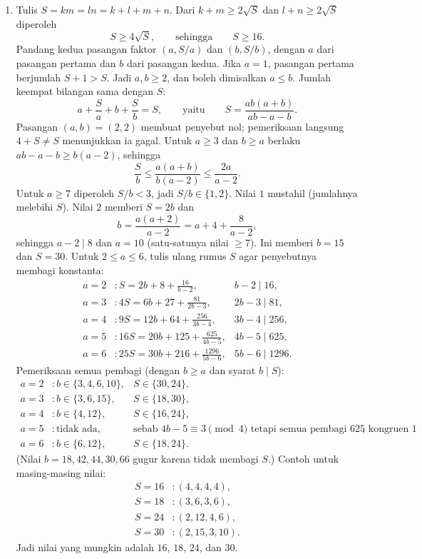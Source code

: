 \documentclass[12pt]{scrartcl}
\begin{document}
\begin{enumerate}[resume]
	\item Tulis $S = km = ln = k + l + m + n$.
	Dari $k + m \ge 2\sqrt{S}$ dan $l + n \ge 2\sqrt{S}$ diperoleh
	\[ S \ge 4\sqrt{S}, \qquad \text{sehingga} \qquad S \ge 16. \]
	Pandang kedua pasangan faktor $(a, S/a)$ dan $(b, S/b)$,
	dengan $a$ dari pasangan pertama dan $b$ dari pasangan kedua.
	Jika $a = 1$, pasangan pertama berjumlah $S + 1 > S$.
	Jadi $a, b \ge 2$, dan boleh dimisalkan $a \le b$.
	Jumlah keempat bilangan sama dengan $S$:
	\[ a + \frac{S}{a} + b + \frac{S}{b} = S, \qquad
	\text{yaitu} \qquad S = \frac{ab(a + b)}{ab - a - b}. \]
	Pasangan $(a, b) = (2, 2)$ membuat penyebut nol;
	pemeriksaan langsung $4 + S \ne S$ menunjukkan ia gagal.
	Untuk $a \ge 3$ dan $b \ge a$ berlaku $ab - a - b \ge b(a - 2)$, sehingga
	\[ \frac{S}{b} \le \frac{a(a + b)}{b(a - 2)} \le \frac{2a}{a - 2}. \]
	Untuk $a \ge 7$ diperoleh $S/b < 3$, jadi $S/b \in \{1, 2\}$.
	Nilai $1$ mustahil (jumlahnya melebihi $S$).
	Nilai $2$ memberi $S = 2b$ dan
	\[ b = \frac{a(a + 2)}{a - 2} = a + 4 + \frac{8}{a - 2}, \]
	sehingga $a - 2 \mid 8$ dan $a = 10$ (satu-satunya nilai $\ge 7$).
	Ini memberi $b = 15$ dan $S = 30$.
	Untuk $2 \le a \le 6$, tulis ulang rumus $S$ agar penyebutnya membagi konstanta:
	\begin{align*}
	a = 2 &: S = 2b + 8 + \frac{16}{b - 2}, &
	b - 2 \mid 16, \\
	a = 3 &: 4S = 6b + 27 + \frac{81}{2b - 3}, &
	2b - 3 \mid 81, \\
	a = 4 &: 9S = 12b + 64 + \frac{256}{3b - 4}, &
	3b - 4 \mid 256, \\
	a = 5 &: 16S = 20b + 125 + \frac{625}{4b - 5}, &
	4b - 5 \mid 625, \\
	a = 6 &: 25S = 30b + 216 + \frac{1296}{5b - 6}, &
	5b - 6 \mid 1296.
	\end{align*}
	Pemeriksaan semua pembagi (dengan $b \ge a$ dan syarat $b \mid S$):
	\begin{align*}
	a = 2 &: b \in \{3, 4, 6, 10\}, & S \in \{30, 24\}, \\
	a = 3 &: b \in \{3, 6, 15\}, & S \in \{18, 30\}, \\
	a = 4 &: b \in \{4, 12\}, & S \in \{16, 24\}, \\
	a = 5 &: \text{tidak ada}, &
	\text{sebab $4b - 5 \equiv 3 \pmod{4}$ tetapi semua pembagi $625$ kongruen $1$}, \\
	a = 6 &: b \in \{6, 12\}, & S \in \{18, 24\}.
	\end{align*}
	(Nilai $b = 18, 42, 44, 30, 66$ gugur karena tidak membagi $S$.)
	Contoh untuk masing-masing nilai:
	\begin{align*}
	S = 16 &: (4, 4, 4, 4), \\
	S = 18 &: (3, 6, 3, 6), \\
	S = 24 &: (2, 12, 4, 6), \\
	S = 30 &: (2, 15, 3, 10).
	\end{align*}
	Jadi nilai yang mungkin adalah $16$, $18$, $24$, dan $30$.


\end{enumerate}
\end{document}
